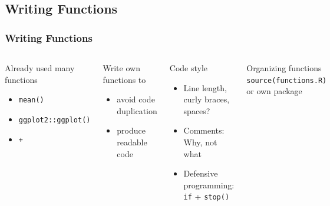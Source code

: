 \subsection{Writing Functions}

\begin{frame}
	\frametitle{Writing Functions}
	\begin{columns}
		\begin{block}{Already used many functions}
			\begin{itemize}
				\item \texttt{mean()}
				\item \texttt{ggplot2::ggplot()}
				\item \texttt{+}
			\end{itemize}
		\end{block}
	
		\begin{block}{Write \alert{own} functions to}
			\begin{itemize}
				\item avoid code duplication
				\item produce readable code
			\end{itemize}
			\begin{example}
			\end{example}
		\end{block}
	
		\begin{block}{Code style}
			\begin{itemize}
				\item Line length, curly braces, spaces?
				\item Comments: Why, not what
				\item Defensive programming: \texttt{if} + \texttt{stop()}
			\end{itemize}
		
			\begin{example}
			\end{example}
		\end{block}
		
		\begin{block}{Organizing functions}
			\texttt{source(functions.R)} or \alert{own package}
			\begin{example}
			\end{example}
		\end{block}
	\end{columns}
\end{frame}

